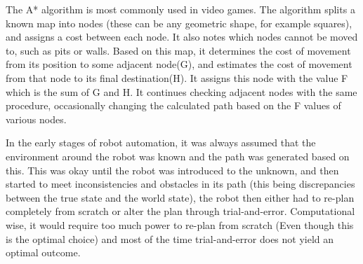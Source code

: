 The A* algorithm is most commonly used in video games. The algorithm splits a known map into nodes (these can be any geometric shape, for example squares), and assigns a cost between each node. It also notes which nodes cannot be moved to, such as pits or walls. Based on this map, it determines the cost of movement from its position to some adjacent node(G), and estimates the cost of movement from that node to its final destination(H). It assigns this node with the value F which is the sum of G and H. It continues checking adjacent nodes with the same procedure, occasionally changing the calculated path based on the F values of various nodes\cite{astar}.

In the early stages of robot automation, it was always assumed that the environment around the robot was known and the path was generated based on this. This was okay until the robot was introduced to the unknown, and then started to meet inconsistencies and obstacles in its path (this being discrepancies between the true state and the world state), the robot then either had to re-plan completely from scratch or alter the plan through trial-and-error. Computational wise, it would require too much power to re-plan from scratch (Even though this is the optimal choice) and most of the time trial-and-error does not yield an optimal outcome.

